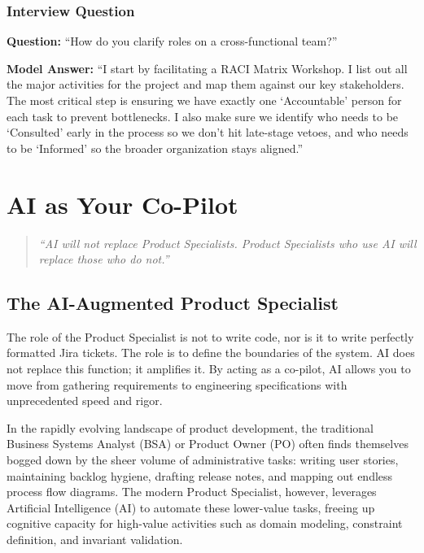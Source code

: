 \subsection{Interview Question}\label{interview-question-1}

\textbf{Question:} ``How do you clarify roles on a cross-functional
team?''

\textbf{Model Answer:} ``I start by facilitating a RACI Matrix Workshop.
I list out all the major activities for the project and map them against
our key stakeholders. The most critical step is ensuring we have exactly
one `Accountable' person for each task to prevent bottlenecks. I also
make sure we identify who needs to be `Consulted' early in the process
so we don't hit late-stage vetoes, and who needs to be `Informed' so the
broader organization stays aligned.''

\chapter{AI as Your Co-Pilot}\label{ai-as-your-co-pilot}

\begin{quote}
\emph{``AI will not replace Product Specialists. Product Specialists who
use AI will replace those who do not.''}
\end{quote}

\section{The AI-Augmented Product
Specialist}\label{the-ai-augmented-product-specialist}

The role of the Product Specialist is not to write code, nor is it to
write perfectly formatted Jira tickets. The role is to define the
boundaries of the system. AI does not replace this function; it
amplifies it. By acting as a co-pilot, AI allows you to move from
gathering requirements to engineering specifications with unprecedented
speed and rigor.

In the rapidly evolving landscape of product development, the
traditional Business Systems Analyst (BSA) or Product Owner (PO) often
finds themselves bogged down by the sheer volume of administrative
tasks: writing user stories, maintaining backlog hygiene, drafting
release notes, and mapping out endless process flow diagrams. The modern
Product Specialist, however, leverages Artificial Intelligence (AI) to
automate these lower-value tasks, freeing up cognitive capacity for
high-value activities such as domain modeling, constraint definition,
and invariant validation.

